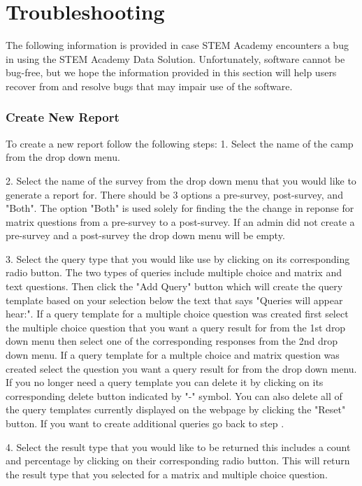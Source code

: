 \documentclass[letterpaper,10pt,serif, draftclsnofoot,onecolumn, compsoc, titlepage]{IEEEtran}
\begin{document}
\section{Troubleshooting}
The following information is provided in case STEM Academy encounters a bug in using the STEM Academy Data Solution.
Unfortunately, software cannot be bug-free, but we hope the information provided in this section will help users recover
 from and resolve bugs that may impair use of the software.
\subsubsection{Create New Report} 
To create a new report follow the following steps:
1. Select the name of the camp from the drop down menu.

2. Select the name of the survey from the drop down menu that you would like to generate a report for. There should be 3 options a pre-survey, post-survey, and "Both". The option "Both" is used solely for finding the the change in reponse for matrix questions from a pre-survey to a post-survey. If an admin did not create a pre-survey and a post-survey the drop down menu will be empty. 

3. Select the query type that you would like use by clicking on its corresponding radio button. 
The two types of queries include multiple choice and matrix and text questions. 
Then click the "Add Query" button which will create the query template based on your selection below the text that says "Queries will appear hear:".  If a query template for a multiple choice question was created first select the multiple choice question that you want a query result for from the 1st drop down menu then select one of the corresponding responses from the 2nd drop down menu. If a query template for a multple choice and matrix question was created select the question you want a query result for from the drop down menu. If you no longer need a query template you can delete it by clicking on its corresponding delete button indicated by "-" symbol. You can also delete all of the query templates currently displayed on the webpage by clicking the "Reset" button. If you want to create additional queries go back to step . 

4. Select the result type that you would like to be returned this includes a count and percentage by clicking on their corresponding radio button. This will return the result type that you selected for a matrix and multiple choice question.
\end{document}
